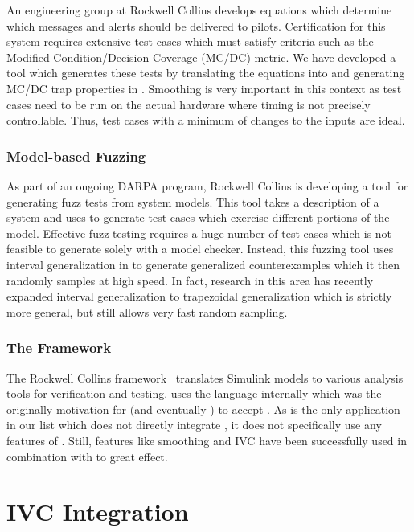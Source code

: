An engineering group at Rockwell Collins develops equations
which determine which messages and alerts should be delivered to
pilots. Certification for this system requires extensive test cases
which must satisfy criteria such as the Modified Condition/Decision
Coverage (MC/DC) metric. We have developed a tool which generates
these tests by translating the equations into \lustre and generating
MC/DC trap properties in \jkind. Smoothing is very important in this
context as test cases need to be run on the actual hardware where
timing is not precisely controllable. Thus, test cases with a minimum
of changes to the inputs are ideal.

\subsubsection{Model-based Fuzzing}

As part of an ongoing DARPA program, Rockwell Collins is
developing a tool for generating fuzz tests from system models. This
tool takes a \lustre description of a system and uses \jkind to
generate test cases which exercise different portions of the model.
Effective fuzz testing requires a huge number of test cases which is
not feasible to generate solely with a model checker. Instead, this
fuzzing tool uses interval generalization in \jkind to generate
generalized counterexamples which it then randomly samples at high
speed. In fact, research in this area has recently expanded interval
generalization to trapezoidal generalization which is strictly more
general, but still allows very fast random sampling.


\subsubsection{The \gryphon Framework}

The Rockwell Collins \gryphon
 framework~\cite{miller2010cacm} translates Simulink models to various
 analysis tools for verification and testing. \gryphon uses the \lustre
 language internally which was the originally motivation for \kind
 (and eventually \jkind) to accept \lustre. As \gryphon is the only
 application in our list which does not directly integrate \jkind, it
 does not specifically use any features of \jkind. Still, features like
 smoothing and IVC have been successfully used in combination with
 \gryphon to great effect.

\section{IVC Integration}

